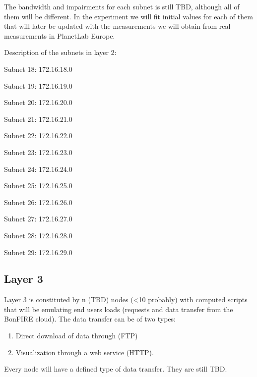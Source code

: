 \documentclass[a4paper]{article}
\newcounter{saveenum}
\newcommand\liststyleLFOxxxvii{%
\renewcommand\theenumi{\alph{enumi}}
\renewcommand\theenumii{\alph{enumii}}
\renewcommand\theenumiii{\roman{enumiii}}
\renewcommand\theenumiv{\arabic{enumiv}}
\renewcommand\labelenumi{\theenumi)}
\renewcommand\labelenumii{\theenumii.}
\renewcommand\labelenumiii{\theenumiii.}
\renewcommand\labelenumiv{\theenumiv.}
}
\begin{document}
\bigskip


\bigskip

The bandwidth and impairments for each subnet is still TBD, although all
of them will be different. In the experiment we will fit initial values
for each of them that will later be updated with the measurements we
will obtain from real measurements in PlanetLab Europe.


\bigskip

Description of the subnets in layer 2:


\bigskip

Subnet 18: 172.16.18.0

Subnet 19: 172.16.19.0

Subnet 20: 172.16.20.0

Subnet 21: 172.16.21.0

Subnet 22: 172.16.22.0

Subnet 23: 172.16.23.0

Subnet 24: 172.16.24.0

Subnet 25: 172.16.25.0

Subnet 26: 172.16.26.0

Subnet 27: 172.16.27.0

Subnet 28: 172.16.28.0

Subnet 29: 172.16.29.0


\bigskip


\bigskip

\subsection[Layer 3]{Layer 3}
\hypertarget{Toc381777233}{}
\bigskip

Layer 3 is constituted by n (TBD) nodes ({\textless}10 probably) with
computed scripts that will be emulating end users loads (requests and
data transfer from the BonFIRE cloud). The data transfer can be of two
types:

\liststyleLFOxxxvii
\setcounter{saveenum}{\value{enumi}}
\begin{enumerate}
\setcounter{enumi}{\value{saveenum}}
\item Direct download of data through (FTP)
\item Visualization through a web service (HTTP).
\end{enumerate}

\bigskip

Every node will have a defined type of data transfer. They are still
TBD.\ 


\bigskip
\end{document}
